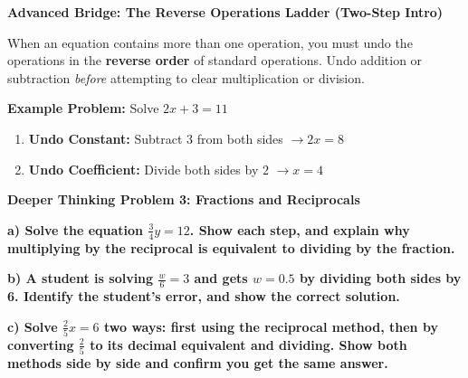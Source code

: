 \documentclass[12pt, letterpaper, fleqn]{article}
\begin{document}
\begin{tcolorbox}[colback=white, colframe=black!25, boxrule=0.8pt]
\textbf{Advanced Bridge: The Reverse Operations Ladder (Two-Step Intro)}

\medskip
When an equation contains more than one operation, you must undo the operations in the \textbf{reverse order} of standard operations. Undo addition or subtraction \textit{before} attempting to clear multiplication or division.

\medskip
\textbf{Example Problem:} Solve $2x + 3 = 11$
\begin{enumerate}[itemsep=2pt]
    \item \textbf{Undo Constant:} Subtract $3$ from both sides $\rightarrow 2x = 8$
    \item \textbf{Undo Coefficient:} Divide both sides by $2$ $\rightarrow x = 4$
\end{enumerate}
\end{tcolorbox}

\vspace{2mm}

\begin{tcolorbox}[colback=white, colframe=black, boxrule=1pt, arc=4mm, left=6mm, right=6mm, top=5mm, bottom=5mm]
\textbf{Deeper Thinking Problem 3: Fractions and Reciprocals}

\medskip

\noindent
\textbf{a) Solve the equation $\frac{3}{4}y = 12$. Show each step, and explain why multiplying by the reciprocal is equivalent to dividing by the fraction.}

\vspace{3cm}

\noindent
\textbf{b) A student is solving $\frac{w}{6} = 3$ and gets $w = 0.5$ by dividing both sides by 6. Identify the student's error, and show the correct solution.}

\vspace{3cm}

\noindent
\textbf{c) Solve $\frac{2}{5}x = 6$ two ways: first using the reciprocal method, then by converting $\frac{2}{5}$ to its decimal equivalent and dividing. Show both methods side by side and confirm you get the same answer.}

\vspace{3cm}

\end{tcolorbox}
\newpage
\end{document}
